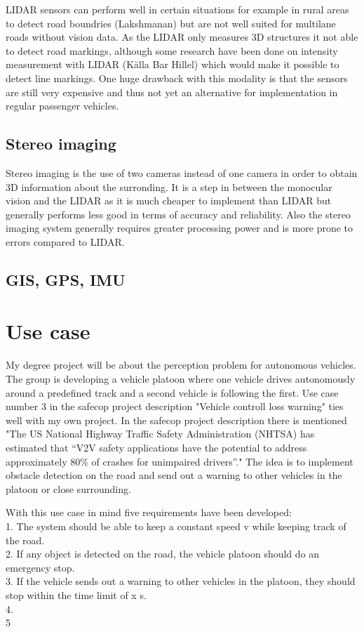 LIDAR sensors can perform well in certain situations for example in rural areas to detect road boundries (Lakshmanan) but are not well suited for multilane roads without vision data. As the LIDAR only measures 3D structures it not able to detect road markings, although some research have been done on intensity measurement with LIDAR (Källa Bar Hillel) which would make it possible to detect line markings. One huge drawback with this modality is that the sensors are still very expensive and thus not yet an alternative for implementation in regular passenger vehicles.
\subsection{Stereo imaging}
Stereo imaging is the use of two cameras instead of one camera in order to obtain 3D information about the surronding. It is a step in between the monocular vision and the LIDAR as it is much cheaper to implement than LIDAR but generally performs less good in terms of accuracy and reliability.  Also the stereo imaging system generally requires greater processing power and is more prone to errors compared to LIDAR. 


\subsection{GIS, GPS, IMU}

\section{Use case}
My degree project will be about the perception problem for autonomous vehicles. The group is developing a vehicle platoon where one vehicle drives autonomously around a predefined track and a second vehicle is following the first. Use case number 3 in the safecop project description "Vehicle controll loss warning" ties well with my own project. In the safecop project description there is mentioned "The US National Highway Traffic Safety Administration (NHTSA) has estimated that “V2V safety
applications have the potential to address approximately 80\% of crashes for unimpaired drivers”." The idea is to implement obstacle detection on the road and send out a warning to other vehicles in the platoon or close surrounding.

With this use case in mind five requirements have been developed:\\
1. The system should be able to keep a constant speed v while keeping track of the road.\\
2. If any object is detected on the road, the vehicle platoon should do an emergency stop.\\
3. If the vehicle sends out a warning to other vehicles in the platoon, they should stop within the time limit of x s. \\
4. \\
5\\

